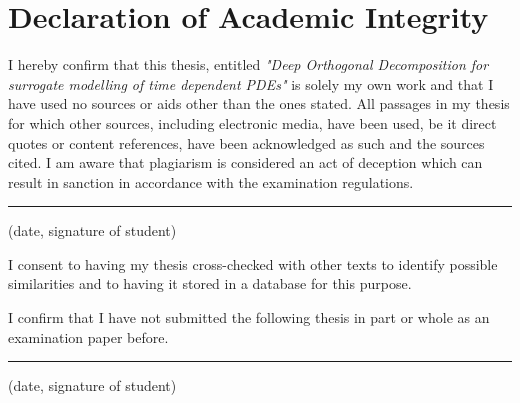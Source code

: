 \documentclass[11 pt, a4paper]{book}
\begin{document}



\cleardoublepage
\pagestyle{empty}
\tableofcontents

\clearpage
\listoftodos
\cleardoublepage

\mainmatter
\pagestyle{fancy}









\printbibliography


\pagebreak
\section*{Declaration of Academic Integrity}
I hereby confirm that this thesis, entitled
\textit{"Deep Orthogonal Decomposition for surrogate modelling of time dependent PDEs"} is 
solely my own work and that I have used no sources or aids other than the ones stated. 
All passages in my thesis for which other sources, 
including electronic media, have been used, be it direct quotes or content references, have been 
acknowledged as such and the sources cited. I am aware that plagiarism is considered an act of deception 
which can result in sanction in accordance with the examination regulations.

\vspace{2cm}

\noindent \rule{10cm}{0.15mm} 

\noindent (date, signature of student)

\vspace{1,5cm}

\noindent I consent to having my thesis cross-checked with other texts to identify possible similarities and to 
having it stored in a database for this purpose.

I confirm that I have not submitted the following thesis in part or whole as an examination paper before.

\vspace{2cm}

\noindent \rule{10cm}{0.15mm}

\noindent (date, signature of student)
\end{document}
